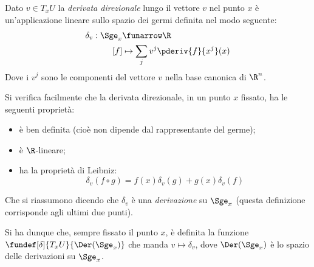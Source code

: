 \begin{defn}
	Dato $v\in T_x U$ la \emph{derivata direzionale} lungo il vettore $v$ nel punto $x$
	è un'applicazione lineare sullo spazio dei germi definita nel modo seguente:
	\begin{align*}
		\delta_v: \Sge_x &\funarrow \R \\
		[f] &\mapsto \sum_j v^j \pderiv{f}{x^j}(x)
	\end{align*}
	Dove i $v^j$ sono le componenti del vettore $v$ nella base canonica di $\R ^n$.
\end{defn}

\begin{oss}
	Si verifica facilmente che la derivata direzionale, in un punto $x$ fissato, ha le seguenti proprietà:
	\begin{itemize}
		\item è ben definita (cioè non dipende dal rappresentante del germe);
		\item è $\R$-lineare;
		\item
			ha la proprietà di Leibniz:
			\[ \delta_v(f\circ g) = f(x)\delta_v(g) + g(x)\delta_v(f) \]
	\end{itemize}
	Che si riassumono dicendo che $\delta_v$ è una \emph{derivazione} su $\Sge_x$ (questa definizione corrisponde agli ultimi due punti).
\end{oss}

Si ha dunque che, sempre fissato il punto $x$, è definita la funzione $\fundef[\delta]{T_x U}{\Der(\Sge_x)}$ che manda $v\mapsto\delta_v$, dove $\Der(\Sge_x)$ è lo spazio delle derivazioni su $\Sge_x$.

